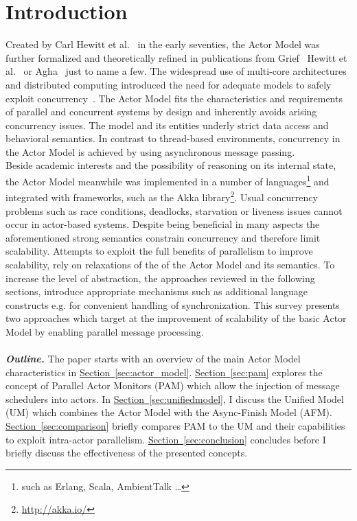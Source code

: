 \documentclass[11pt, journal]{IEEEtran}
\newcommand{\secref}[1]{\hyperref[{sec:#1}]{Section~\ref*{sec:#1}}}
\begin{document}
\section{Introduction}\label{sec:introduction}
Created by Carl Hewitt et al.~\cite{Hewitt:1973:UMA:1624775.1624804} in the early seventies, the Actor Model was further formalized and theoretically refined in publications from Grief~\cite{Grief:1975:SCP:888942} Hewitt et al.~\cite{Hewi77a} or Agha~\cite{Agha:1985:AMC:912083} just to name a few.
The widespread use of multi-core architectures and distributed computing introduced the need for adequate models to safely exploit concurrency~\cite{Sutter:2005:SCR:1095408.1095421}. The Actor Model fits the characteristics and requirements of parallel and concurrent systems by design and inherently avoids arising concurrency issues. The model and its entities underly strict data access and behavioral semantics. In contrast to thread-based environments, concurrency in the Actor Model is achieved by using asynchronous message passing.\\ 
Beside academic interests and the possibility of reasoning on its internal state, the Actor Model meanwhile was implemented in a number of languages\footnote{such as Erlang, Scala, AmbientTalk \dots} and integrated with frameworks, such as the Akka library\footnote{\url{http://akka.io/}}. Usual concurrency problems such as race conditions, deadlocks, starvation or liveness issues cannot occur in actor-based systems. Despite being beneficial in many aspects the aforementioned strong semantics constrain concurrency and therefore limit scalability. Attempts to exploit the full benefits of parallelism to improve scalability, rely on relaxations of the of the Actor Model and its semantics. To increase the level of abstraction, the approaches reviewed in the following sections, introduce appropriate mechanisms such as additional language constructs e.g. for convenient handling of synchronization. This survey presents two approaches which target at the improvement of scalability of the basic Actor Model by enabling parallel message processing.\\\\
{\bf\emph{Outline.}}
The paper starts with an overview of the main Actor Model characteristics in \secref{actor_model}. \secref{pam} explores the concept of Parallel Actor Monitors (PAM) which allow the injection of message schedulers into actors. In \secref{unifiedmodel}, I discuss the Unified Model (UM) which combines the Actor Model with the Async-Finish Model (AFM). \secref{comparison} briefly compares PAM to the UM and their capabilities to exploit intra-actor parallelism. \secref{conclusion} concludes before I briefly discuss the effectiveness of the presented concepts.\\
\end{document}
